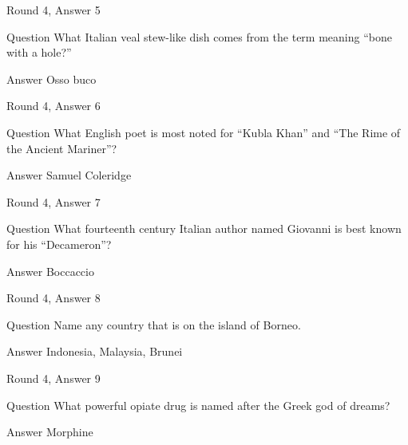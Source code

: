 \documentclass[11pt]{beamer}
\begin{document}
\begin{frame}[t]{Round 4, Answer 5}
\vspace{2em}
\begin{block}{Question}
What Italian veal stew-like dish comes from the term meaning ``bone with a hole?''
\end{block}
\pause{}
\begin{block}{Answer}
Osso buco
\end{block}
\end{frame}
    

\begin{frame}[t]{Round 4, Answer 6}
\vspace{2em}
\begin{block}{Question}
What English poet is most noted for ``Kubla Khan'' and ``The Rime of the Ancient Mariner''\@?
\end{block}
\pause{}
\begin{block}{Answer}
Samuel Coleridge
\end{block}
\end{frame}
    

\begin{frame}[t]{Round 4, Answer 7}
\vspace{2em}
\begin{block}{Question}
What fourteenth century Italian author named Giovanni is best known for his ``Decameron''\@?
\end{block}
\pause{}
\begin{block}{Answer}
Boccaccio
\end{block}
\end{frame}
    

\begin{frame}[t]{Round 4, Answer 8}
\vspace{2em}
\begin{block}{Question}
Name any country that is on the island of Borneo.
\end{block}
\pause{}
\begin{block}{Answer}
Indonesia, Malaysia, Brunei
\end{block}
\end{frame}
    

\begin{frame}[t]{Round 4, Answer 9}
\vspace{2em}
\begin{block}{Question}
What powerful opiate drug is named after the Greek god of dreams\@?
\end{block}
\pause{}
\begin{block}{Answer}
Morphine
\end{block}
\end{frame}
    
\end{document}
